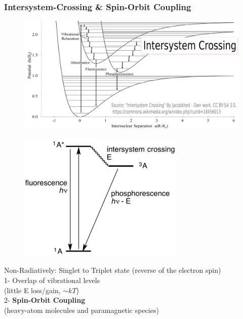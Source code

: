 \documentclass[compress]{beamer}
\begin{document}
\begin{frame}
  \frametitle{Intersystem-Crossing \& Spin-Orbit Coupling}
\begin{figure}[H]
\hspace{-10pt}\includegraphics[width=0.9\columnwidth]{../img/SF_esq20.pdf}
\end{figure}
\begin{multicols}{2}

\hspace{-20pt}\vspace{-20pt}
\begin{figure}[H]
\hspace{-20pt}\vspace{-20pt}\includegraphics[width=0.7\columnwidth]{../img/SF_esq19.png}
\end{figure}
\footnotesize
\hspace{-20pt}Non-Radiatively: Singlet to Triplet state (reverse of the electron spin)\\
\hspace{-20pt}1- Overlap of vibrational levels\\
(little E loss/gain, $\sim kT$)\\
\hspace{-20pt}2- \textbf{Spin-Orbit Coupling}\\
(heavy-atom molecules and paramagnetic species)

\end{multicols}
\end{frame}
\end{document}
